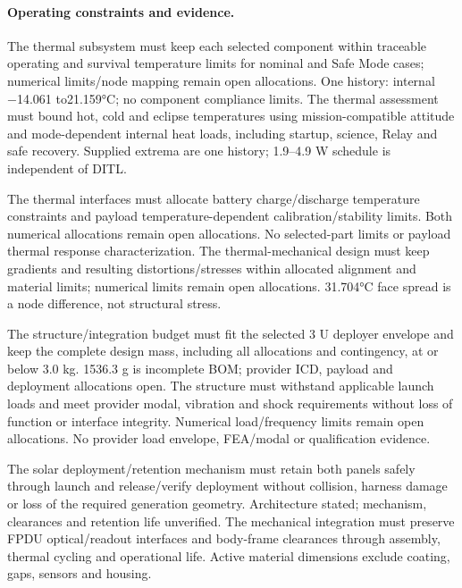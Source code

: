 \paragraph{Operating constraints and evidence.} 
The thermal subsystem must keep each selected component within traceable operating and survival temperature limits for nominal and Safe Mode cases; numerical limits/node mapping remain open allocations. One history: internal −14.061 to21.159°C; no component compliance limits.
The thermal assessment must bound hot, cold and eclipse temperatures using mission-compatible attitude and mode-dependent internal heat loads, including startup, science, Relay and safe recovery. Supplied extrema are one history; 1.9–4.9 W schedule is independent of DITL.

The thermal interfaces must allocate battery charge/discharge temperature constraints and payload temperature-dependent calibration/stability limits. Both numerical allocations remain open allocations. No selected-part limits or payload thermal response characterization.
The thermal-mechanical design must keep gradients and resulting distortions/stresses within allocated alignment and material limits; numerical limits remain open allocations. 31.704°C face spread is a node difference, not structural stress.

The structure/integration budget must fit the selected 3 U deployer envelope and keep the complete design mass, including all allocations and contingency, at or below 3.0 kg. 1536.3 g is incomplete BOM; provider ICD, payload and deployment allocations open.
The structure must withstand applicable launch loads and meet provider modal, vibration and shock requirements without loss of function or interface integrity. Numerical load/frequency limits remain open allocations. No provider load envelope, FEA/modal or qualification evidence.

The solar deployment/retention mechanism must retain both panels safely through launch and release/verify deployment without collision, harness damage or loss of the required generation geometry. Architecture stated; mechanism, clearances and retention life unverified.
The mechanical integration must preserve FPDU optical/readout interfaces and body-frame clearances through assembly, thermal cycling and operational life. Active material dimensions exclude coating, gaps, sensors and housing.

